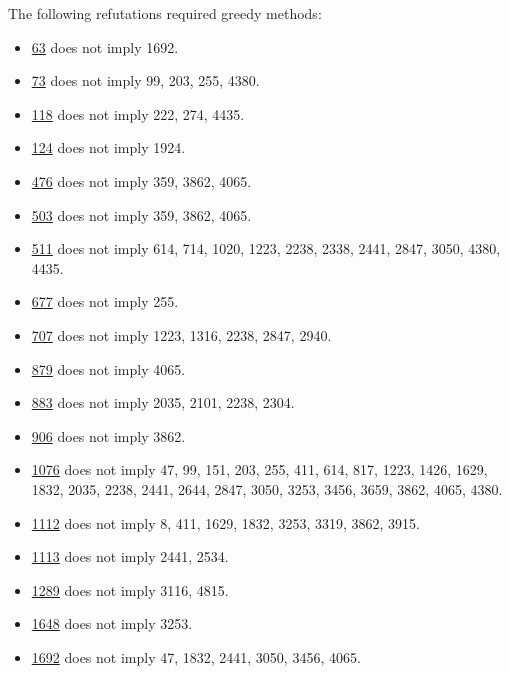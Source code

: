 The following refutations required greedy methods:
\begin{itemize}
\item \href{https://teorth.github.io/equational_theories/implications/?63}{63} does not imply 1692.
\item \href{https://teorth.github.io/equational_theories/implications/?73}{73} does not imply 99, 203, 255, 4380.
\item \href{https://teorth.github.io/equational_theories/implications/?118}{118} does not imply 222, 274, 4435.
\item \href{https://teorth.github.io/equational_theories/implications/?124}{124} does not imply 1924.
\item \href{https://teorth.github.io/equational_theories/implications/?476}{476} does not imply 359, 3862, 4065.
\item \href{https://teorth.github.io/equational_theories/implications/?503}{503} does not imply 359, 3862, 4065.
\item \href{https://teorth.github.io/equational_theories/implications/?503}{511} does not imply 614, 714, 1020, 1223, 2238, 2338, 2441, 2847, 3050, 4380, 4435.
\item \href{https://teorth.github.io/equational_theories/implications/?677}{677} does not imply 255.
\item \href{https://teorth.github.io/equational_theories/implications/?707}{707} does not imply 1223, 1316, 2238, 2847, 2940.
\item \href{https://teorth.github.io/equational_theories/implications/?879}{879} does not imply 4065.
\item \href{https://teorth.github.io/equational_theories/implications/?883}{883} does not imply 2035, 2101, 2238, 2304.
\item \href{https://teorth.github.io/equational_theories/implications/?906}{906} does not imply 3862.
\item \href{https://teorth.github.io/equational_theories/implications/?1076}{1076} does not imply 47, 99, 151, 203, 255, 411, 614, 817, 1223, 1426, 1629, 1832, 2035, 2238, 2441, 2644, 2847, 3050, 3253, 3456, 3659, 3862, 4065, 4380.
\item \href{https://teorth.github.io/equational_theories/implications/?1112}{1112} does not imply 8, 411, 1629, 1832, 3253, 3319, 3862, 3915.
\item \href{https://teorth.github.io/equational_theories/implications/?1113}{1113} does not imply 2441, 2534.
\item \href{https://teorth.github.io/equational_theories/implications/?1289}{1289} does not imply 3116, 4815.
\item \href{https://teorth.github.io/equational_theories/implications/?1648}{1648} does not imply 3253.
\item \href{https://teorth.github.io/equational_theories/implications/?1692}{1692} does not imply 47, 1832, 2441, 3050, 3456, 4065.
\end{itemize}

